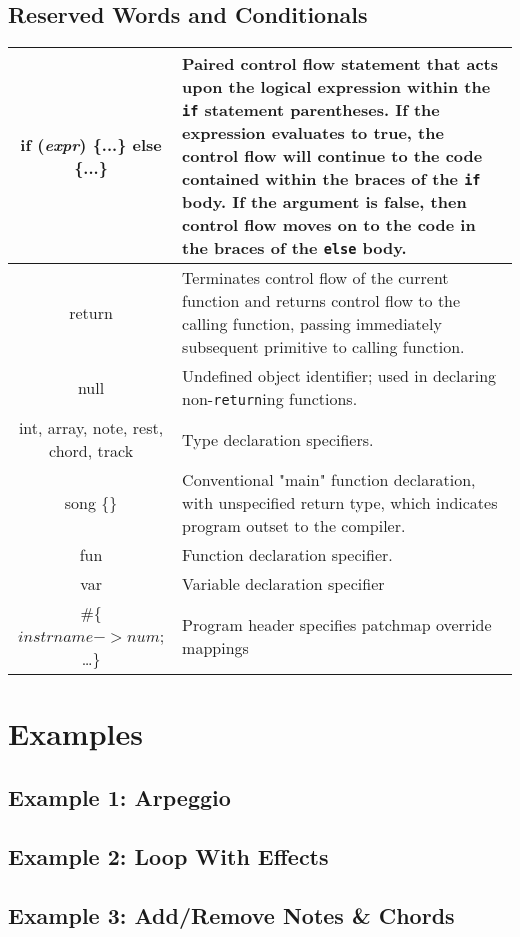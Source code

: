 \documentclass[letterpaper]{article}
\begin{document}
\begin{samepage}
\subsection{Reserved Words and Conditionals}
\begin{table}[H]
\centering
\begin{tabularx}{.75\textwidth}{|c|X|}
\hline
if (\textit{expr}) \{...\} else \{...\}& Paired control flow statement that acts upon the logical expression within the \texttt{if} statement parentheses. If the expression evaluates to true, the control flow will continue to the code contained within the braces of the \texttt{if} body. If the argument is false, then control flow moves on to the code in the braces of the \texttt{else} body. \\
\hline
return & Terminates control flow of the current function and returns control flow to the calling function, passing immediately subsequent primitive to calling function.\\
\hline
null & Undefined object identifier; used in declaring non-\texttt{return}ing functions. \\
\hline
int, array, note, rest, chord, track & Type declaration specifiers.\\
\hline
song \{\} & Conventional "main" function declaration, with unspecified return type, which indicates program outset to the compiler.\\
\hline
fun & Function declaration specifier.\\
\hline
var & Variable declaration specifier\\
\hline
\#\{ $instrname -> num$; \ldots \} & Program header specifies patchmap override mappings\\
\hline
\end{tabularx}
\end{table}
\end{samepage}

\section{Examples}

\begin{minipage}{\linewidth}
\subsection{Example 1: Arpeggio}

\end{minipage}

\begin{minipage}{\linewidth}
\subsection{Example 2: Loop With Effects}

\end{minipage}

\begin{minipage}{\linewidth}
\subsection{Example 3: Add/Remove Notes \& Chords}

\end{minipage}
\end{document}
